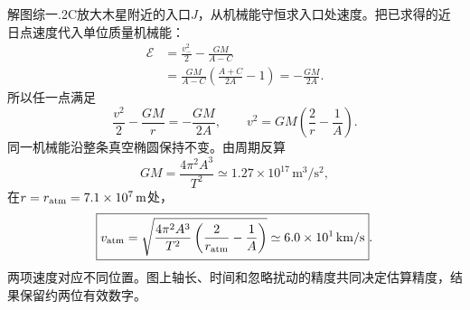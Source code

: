 \documentclass[UTF8,fontset=fandol,a4paper,11pt]{ctexart}
\begin{document}
解图综一.2C放大木星附近的入口$J$，从机械能守恒求入口处速度。把已求得的近日点速度代入单位质量机械能：
\[
\begin{aligned}
\mathcal E&=\frac{v_-^2}{2}-\frac{GM}{A-C}\\
&=\frac{GM}{A-C}\left(\frac{A+C}{2A}-1\right)
=-\frac{GM}{2A}.
\end{aligned}
\]
所以任一点满足
\[
\frac{v^2}{2}-\frac{GM}{r}=-\frac{GM}{2A},
\qquad v^2=GM\left(\frac2r-\frac1A\right).
\]
同一机械能沿整条真空椭圆保持不变。由周期反算
\[
GM=\frac{4\pi^2A^3}{T^2}
\simeq1.27\times10^{17}\,\mathrm{m^3/s^2},
\]
在$r=r_{\rm atm}=7.1\times10^7\,\mathrm m$处，
\[
\boxed{v_{\rm atm}
=\sqrt{\frac{4\pi^2A^3}{T^2}
\left(\frac2{r_{\rm atm}}-\frac1A\right)}
\simeq6.0\times10^1\,\mathrm{km/s}}.
\]
两项速度对应不同位置。图上轴长、时间和忽略扰动的精度共同决定估算精度，结果保留约两位有效数字。
\end{document}
